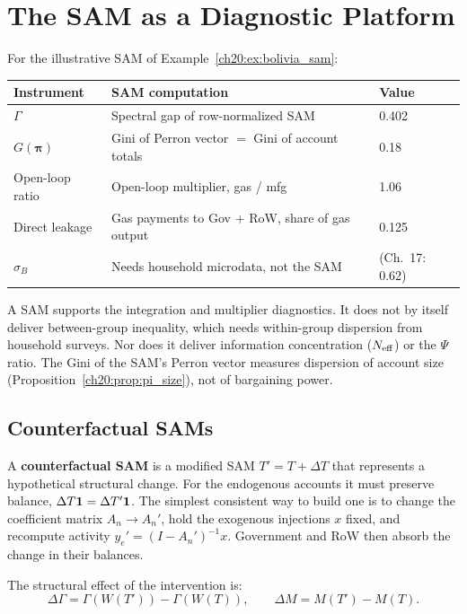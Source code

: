\documentclass[../structural_economics_book.tex]{subfiles}
\begin{document}
\section{The SAM as a Diagnostic Platform}
\label{ch20:sec:platform}

\begin{remark}\label{ch20:prop:five_from_sam}
For the illustrative SAM of Example~\ref{ch20:ex:bolivia_sam}:

\begin{center}
\small
\begin{tabular}{lll}
\toprule
\textbf{Instrument} & \textbf{SAM computation} & \textbf{Value} \\
\midrule
$\Gamma$ & Spectral gap of row-normalized SAM & 0.402 \\
$G(\boldsymbol{\pi})$ & Gini of Perron vector $=$ Gini of account totals & 0.18 \\
Open-loop ratio & Open-loop multiplier, gas / mfg & 1.06 \\
Direct leakage & Gas payments to Gov $+$ RoW, share of gas output & 0.125 \\
$\sigma_B$ & Needs household microdata, not the SAM & (Ch.~17: 0.62) \\
\bottomrule
\end{tabular}
\end{center}

A SAM supports the integration and multiplier diagnostics. It does not by itself deliver between-group inequality, which needs within-group dispersion from household surveys. Nor does it deliver information concentration ($N_{\text{eff}}$) or the $\Psi$ ratio. The Gini of the SAM's Perron vector measures dispersion of account size (Proposition~\ref{ch20:prop:pi_size}), not of bargaining power.
\end{remark}


\subsection{Counterfactual SAMs}

\begin{definition}\label{ch20:def:counterfactual}
A \textbf{counterfactual SAM} is a modified SAM $T' = T + \Delta T$ that represents a hypothetical structural change. For the endogenous accounts it must preserve balance, $\Delta T \mathbf{1} = \Delta T' \mathbf{1}$. The simplest consistent way to build one is to change the coefficient matrix $A_n \to A_n'$, hold the exogenous injections $x$ fixed, and recompute activity $y_e' = (I - A_n')^{-1}x$. Government and RoW then absorb the change in their balances.

The structural effect of the intervention is:
\begin{equation}\label{ch20:eq:counterfactual}
\Delta\Gamma = \Gamma(W(T')) - \Gamma(W(T)), \qquad \Delta M = M(T') - M(T).
\end{equation}
\end{definition}
\end{document}
